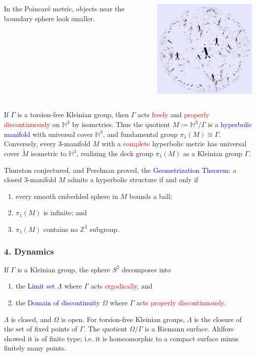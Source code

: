 \documentclass{beamer}
\def\Z{\mathbb{Z}}
\def\H{\mathbb{H}}
\begin{document}
\frame
{
\begin{columns}[c]
\column{1.1in}
In the Poincar\'e
metric, objects near the
boundary sphere look
smaller.
\column{3in}
\begin{center}
\includegraphics[width=3in]{Poincare.png}
\end{center}
\end{columns}
}
\frame
{
If $\Gamma$ is a torsion-free Kleinian group, then
$\Gamma$ acts \textcolor{red}{freely} and \textcolor{red}{properly discontinuously}
on $\H^3$ by isometries.
\vskip 10pt
Thus the quotient $M:=\H^3/\Gamma$ is a \textcolor{blue}{hyperbolic manifold}
with universal cover $\H^3$, and fundamental group $\pi_1(M)\cong \Gamma$.
\vskip 10pt
Conversely, every 3-manifold $M$ with a \textcolor{red}{complete} hyperbolic
metric has universal cover $\widetilde{M}$ isometric to $\H^3$, realizing
the deck group $\pi_1(M)$ as a Kleinian group $\Gamma$.
}
\frame
{
Thurston conjectured, and Perelman proved, the 
\vskip 10pt
\textcolor{blue}{Geometrization Theorem}: a closed 3-manifold $M$ admits a hyperbolic structure if and only if
\begin{enumerate}
\item{every smooth embedded sphere in $M$ bounds a ball;}
\item{$\pi_1(M)$ is infinite; and}
\item{$\pi_1(M)$ contains no $\Z^2$ subgroup.}
\end{enumerate}
}
\frame
{
\frametitle{4. Dynamics}
If $\Gamma$ is a Kleinian group, the sphere $S^2$ decomposes into 
\begin{enumerate}
\item{the \textcolor{blue}{Limit set} 
$\Lambda$ where $\Gamma$ acts \textcolor{red}{ergodically}, and}
\item{the \textcolor{blue}{Domain of discontinuity}
$\Omega$ where $\Gamma$ acts \textcolor{red}{properly discontinuously}.}
\end{enumerate}
$\Lambda$ is closed, and $\Omega$ is open. For torsion-free 
Kleinian groups, $\Lambda$ is the closure of the set of fixed points of $\Gamma$.
\vskip 10pt
The quotient $\Omega/\Gamma$ is a Riemann surface. Ahlfors showed it is of
\textcolor{dgreen}{finite type}; i.e.\/ it is homeomorphic to a compact surface
minus finitely many points.
}
\end{document}
